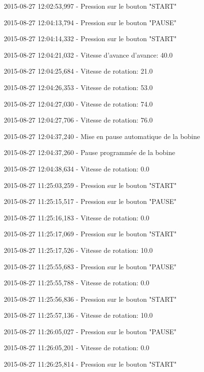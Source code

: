 \documentclass[a4paper, 11pt]{article}
\begin{document}
2015-08-27 12\string:02\string:53,997 - Pression sur le bouton "START"

2015-08-27 12\string:04\string:13,794 - Pression sur le bouton "PAUSE"

2015-08-27 12\string:04\string:14,332 - Pression sur le bouton "START"

2015-08-27 12\string:04\string:21,032 - Vitesse d'avance d'avance\string: 40.0

2015-08-27 12\string:04\string:25,684 - Vitesse de rotation\string: 21.0

2015-08-27 12\string:04\string:26,353 - Vitesse de rotation\string: 53.0

2015-08-27 12\string:04\string:27,030 - Vitesse de rotation\string: 74.0

2015-08-27 12\string:04\string:27,706 - Vitesse de rotation\string: 76.0

2015-08-27 12\string:04\string:37,240 - Mise en pause automatique de la bobine

2015-08-27 12\string:04\string:37,260 - Pause programmée de la bobine

2015-08-27 12\string:04\string:38,634 - Vitesse de rotation\string: 0.0

2015-08-27 11\string:25\string:03,259 - Pression sur le bouton "START"

2015-08-27 11\string:25\string:15,517 - Pression sur le bouton "PAUSE"

2015-08-27 11\string:25\string:16,183 - Vitesse de rotation\string: 0.0

2015-08-27 11\string:25\string:17,069 - Pression sur le bouton "START"

2015-08-27 11\string:25\string:17,526 - Vitesse de rotation\string: 10.0

2015-08-27 11\string:25\string:55,683 - Pression sur le bouton "PAUSE"

2015-08-27 11\string:25\string:55,788 - Vitesse de rotation\string: 0.0

2015-08-27 11\string:25\string:56,836 - Pression sur le bouton "START"

2015-08-27 11\string:25\string:57,136 - Vitesse de rotation\string: 10.0

2015-08-27 11\string:26\string:05,027 - Pression sur le bouton "PAUSE"

2015-08-27 11\string:26\string:05,201 - Vitesse de rotation\string: 0.0

2015-08-27 11\string:26\string:25,814 - Pression sur le bouton "START"
\end{document}
